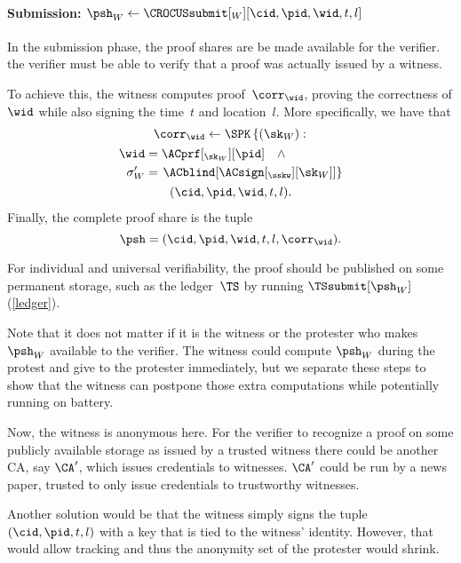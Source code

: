 \paragraph*{Submission:
  \(\psh_W\gets \CROCUSsubmit[_W][\cid, \pid, \wid, t, l]\)}

In the submission phase, the proof shares are be made available for the 
verifier.
\Ie the verifier must be able to verify that a proof was actually issued by a 
witness.

To achieve this, the witness computes  proof~\(\corr_{\wid}\), 
proving the correctness of \(\wid\) while also signing the time~\(t\) and 
location~\(l\).
More specifically, we have that
\begin{multline*}
  \corr_{\wid}\gets \SPK\left\{ (\sk_W) : \right. \\
    \begin{aligned}
      \wid &= \ACprf[_{\sk_W}][\pid] \quad \land \\
      \sigma_W' &= \left. \ACblind[\ACsign[_{\sskw}][\sk_W]] \right\}
    \end{aligned} \\
      (\cid, \pid, \wid, t, l).
\end{multline*}
Finally, the complete proof share is the tuple \[
  \psh = (\cid, \pid, \wid, t, l, \corr_{\wid}).
\]

For individual and universal verifiability, the proof should be published on 
some permanent storage, such as the ledger~\(\TS\) by running 
\(\TSsubmit[\psh_W]\) (\cref{ledger}).

Note that it does not matter if it is the witness or the protester who makes 
\(\psh_W\) available to the verifier.
The witness could compute \(\psh_W\) during the protest and give to the 
protester immediately, but we separate these steps to show that the witness can 
postpone those extra computations while potentially running on battery.

Now, the witness is anonymous here.
For the verifier to recognize a proof on some publicly available storage as 
issued by a trusted witness there could be another \ac{CA}, say \(\CA'\), which 
issues credentials to witnesses.
\(\CA'\) could be run by a news paper, trusted to only issue credentials to 
trustworthy witnesses.

Another solution would be that the witness simply signs the tuple \((\cid, 
\pid, t, l)\) with a key that is tied to the witness' identity.
However, that would allow tracking and thus the anonymity set of the protester 
would shrink.

